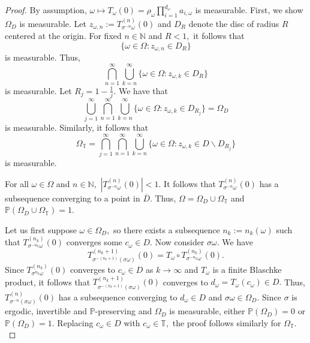 \documentclass[12pt,reqno]{amsart}
\numberwithin{theorem}{section}
\begin{document}
\begin{proof}
    By assumption,  $\omega\mapsto T_{\omega}(0)=\rho_{\omega}\prod_{i=1}^{d_{\omega}}a_{i,\omega}$ is measurable. First, we show $\Omega_{D}$ is measurable. Let $z_{\omega,n}:=T_{\sigma^{-n}\omega}^{(n)}(0)$ and $D_{R}$ denote the disc of radius $R$ centered at the origin. For fixed $n\in\mathbb{N}$ and $R<1,$ it follows that $$\{\omega\in\Omega:z_{\omega, n}\in D_{R}\}$$ is measurable. Thus,  $$\bigcap_{n=1}^{\infty}\bigcup_{k=n}^{\infty}\{\omega\in\Omega:z_{\omega, k}\in D_{R}\}$$ is measurable. Let $R_{j}=1-\frac{1}{j}.$ We have that $$\bigcup_{j=1}^{\infty}\bigcap_{n=1}^{\infty}\bigcup_{k=n}^{\infty}\{\omega\in\Omega:z_{\omega, k}\in D_{R_j}\}=\Omega_{D}$$ is measurable.
    Similarly, it follows that $$\Omega_{\mathbb{T}}=\bigcap_{j=1}^{\infty}\bigcap_{n=1}^{\infty}\bigcup_{k=n}^{\infty}\{\omega\in\Omega:z_{\omega,k}\in D\backslash D_{R_{j}}\}$$ is measurable.
    
    For all $\omega\in\Omega$ and $n\in\mathbb{N},$ $|T_{\sigma^{-n}\omega}^{(n)}(0)|<1.$ It follows that $T_{\sigma^{-n}\omega}^{(n)}(0)$ has a subsequence converging to a point in $\overline{D}.$ Thus, $\Omega=\Omega_{D}\cup\Omega_{\mathbb{T}}$ and $\mathbb{P}(\Omega_{D}\cup\Omega_{\mathbb{T}})=1.$

    Let us first suppose $\omega\in\Omega_{D},$ so there exists a subsequence $n_k:=n_k(\omega)$ such that $T_{\sigma^{-n_k}\omega}^{(n_k)}(0)$ converges some $c_{\omega}\in D.$ Now consider $\sigma\omega.$  We have $$T_{\sigma^{-(n_k+1)}(\sigma\omega)}^{(n_k+1)}(0)=T_{\omega}\circ T_{\sigma^{-n_k}\omega}^{(n_k)}(0).$$ Since $T_{\sigma^{n_k}\omega}^{(n_k)}(0)$ converges to $c_{\omega}\in D$ as $k\to\infty$ and $T_{\omega}$ is a finite Blaschke product, it follows that $T_{\sigma^{-(n_k+1)}(\sigma\omega)}^{(n_k+1)}(0)$ converges to $d_{\omega}=T_{\omega}(c_{\omega})\in D.$ Thus, $T_{\sigma^{-n}(\sigma\omega)}^{(n)}(0)$ has a subsequence converging to $d_{\omega}\in D$ and $\sigma\omega\in\Omega_{D}.$ Since $\sigma$ is ergodic, invertible and $\mathbb{P}$-preserving and $\Omega_{D}$ is measurable, either $\mathbb{P}(\Omega_{D})=0$ or  $\mathbb{P}(\Omega_{D})=1.$ Replacing $c_{\omega}\in D$ with $c_{\omega}\in\mathbb{T},$ the proof follows similarly for $\Omega_{\mathbb{T}}.$ 
\end{proof}
\end{document}
